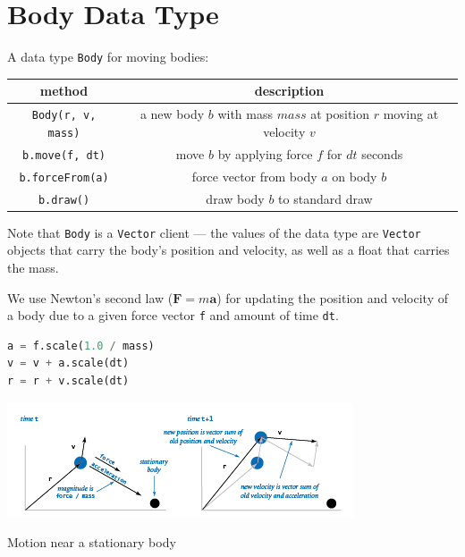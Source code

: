 \documentclass[8pt,a4paper,compress,handout]{beamer}
\begin{document}
\section{Body Data Type}
\begin{frame}[fragile]
A data type \lstinline{Body} for moving bodies:
\begin{center}
\begin{tabular}{cc}
method & description \\ \hline
\lstinline$Body(r, v, mass)$ & a new body $b$ with mass $mass$ at position $r$ moving at velocity $v$ \\
\lstinline$b.move(f, dt)$ & move $b$ by applying force $f$ for $dt$ seconds \\
\lstinline$b.forceFrom(a)$ & force vector from body $a$ on body $b$ \\
\lstinline$b.draw()$ & draw body $b$ to standard draw
\end{tabular} 
\end{center}

\bigskip

Note that \lstinline{Body} is a \lstinline{Vector} client --- the values of the data type are \lstinline{Vector} objects that carry the body's position and velocity, as well as a float that carries the mass.

\bigskip

We use Newton's second law ($\mathbf{F}=m\mathbf{a}$) for updating the position and velocity of a body due to a given force vector \lstinline{f} and amount of time \lstinline{dt}.
\begin{lstlisting}[language=Python]
a = f.scale(1.0 / mass)
v = v + a.scale(dt)
r = r + v.scale(dt)
\end{lstlisting}

\begin{center}
\includegraphics[scale=0.45]{figures/vector_add_acc.png}

\smallskip

\tiny Motion near a stationary body
\end{center}
\end{frame}
\end{document}
